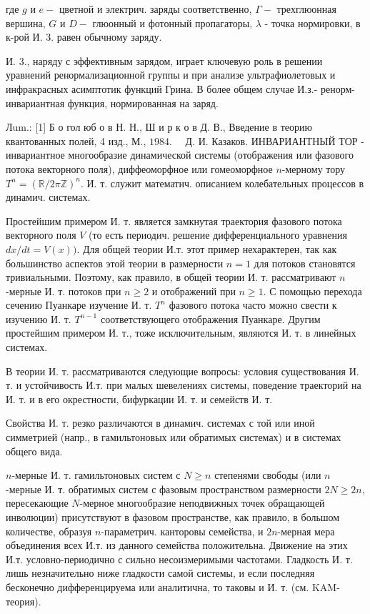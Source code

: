 \documentclass[10pt]{article}
\begin{document}
где $g$ и $e-$ цветной и электрич. заряды соответственно, $\Gamma-$ трехглюонная вершина, $G$ и $D-$ глюонный и фотонный пропагаторы, $\lambda$ - точка нормировки, в к-рой И. 3. равен обычному заряду.



И. 3., наряду с эффективным зарядом, играет ключевую роль в решении уравнений ренормализационной группы и при анализе ультрафиолетовых и инфракрасных асимптотик функций Грина. В более общем случае И.з.- ренорм-инвариантная функция, нормированная на заряд.



Лum.: [1] Б о гол юб о в Н. Н., Ш и р к о в Д. В., Введение в теорию квантованных полей, 4 изд., М., $1984 . \quad$ Д. И. Казаков. ИНВАРИАНТНЫЙ ТОР - инвариантное многообразие динамической системы (отображения или фазового потока векторного поля), диффеоморфное или гомеоморфное $n$-мерному тору $T^{n}=(\mathbb{R} / 2 \pi \mathbb{Z})^{n}$. И. т. служит математич. описанием колебательных процессов в динамич. системах.



Простейшим примером И. т. является замкнутая траектория фазового потока векторного поля $V$ (то есть периодич. решение дифференциального уравнения $d x / d t=V(x))$. Для общей теории И.т. этот пример нехарактерен, так как большинство аспектов этой теории в размерности $n=1$ для потоков становятся тривиальными. Поэтому, как правило, в общей теории И. т. рассматривают $n$-мерные И. т. потоков при $n \geqslant 2$ и отображений при $n \geqslant 1$. С помощью перехода сечению Пуанкаре изучение И. т. $T^{n}$ фазового потока часто можно свести к изучению И. т. $T^{n-1}$ соответствующего отображения Пуанкаре. Другим простейшим примером И. т., тоже исключительным, являются И. т. в линейных системах.



В теории И. т. рассматриваются следующие вопросы: условия существования И. т. и устойчивость И.т. при малых шевелениях системы, поведение траекторий на И. т. и в его окрестности, бифуркации И. т. и семейств И. т.



Свойства И. т. резко различаются в динамич. системах с той или иной симметрией (напр., в гамильтоновых или обратимых системах) и в системах общего вида.



$n$-мерные И. т. гамильтоновых систем с $N \geqslant n$ степенями свободы (или $n$-мерные И. т. обратимых систем с фазовым пространством размерности $2 N \geqslant 2 n$, пересекающие $N$-мерное многообразие неподвижных точек обращающей инволюции) присутствуют в фазовом пространстве, как правило, в большом количестве, образуя $n$-параметрич. канторовы семейства, и $2 n$-мерная мера объединения всех И.т. из данного семейства положительна. Движение на этих И.т. условно-периодично с сильно несоизмеримыми частотами. Гладкость И. т. лишь незначительно ниже гладкости самой системы, и если последняя бесконечно дифференцируема или аналитична, то таковы и И. т. (см. KAM-теория).
\end{document}
